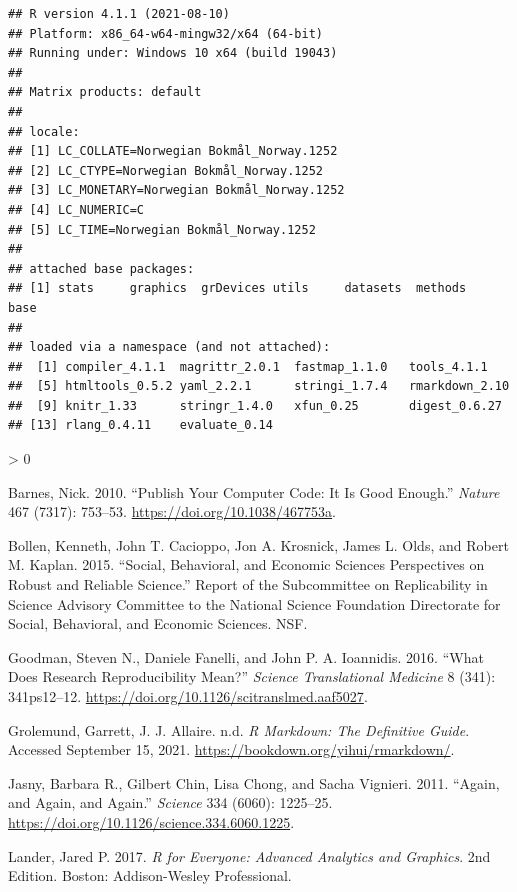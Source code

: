 \documentclass[
]{article}
\newlength{\cslhangindent}
\newenvironment{CSLReferences}[2] %
 {%
  \setlength{\parindent}{0pt}
  \ifodd #1 \everypar{\setlength{\hangindent}{\cslhangindent}}\ignorespaces\fi
  \ifnum #2 > 0
  \setlength{\parskip}{#2\baselineskip}
  \fi
 }%
 {}
\begin{document}
\begin{verbatim}
## R version 4.1.1 (2021-08-10)
## Platform: x86_64-w64-mingw32/x64 (64-bit)
## Running under: Windows 10 x64 (build 19043)
## 
## Matrix products: default
## 
## locale:
## [1] LC_COLLATE=Norwegian Bokmål_Norway.1252 
## [2] LC_CTYPE=Norwegian Bokmål_Norway.1252   
## [3] LC_MONETARY=Norwegian Bokmål_Norway.1252
## [4] LC_NUMERIC=C                            
## [5] LC_TIME=Norwegian Bokmål_Norway.1252    
## 
## attached base packages:
## [1] stats     graphics  grDevices utils     datasets  methods   base     
## 
## loaded via a namespace (and not attached):
##  [1] compiler_4.1.1  magrittr_2.0.1  fastmap_1.1.0   tools_4.1.1    
##  [5] htmltools_0.5.2 yaml_2.2.1      stringi_1.7.4   rmarkdown_2.10 
##  [9] knitr_1.33      stringr_1.4.0   xfun_0.25       digest_0.6.27  
## [13] rlang_0.4.11    evaluate_0.14
\end{verbatim}

\hypertarget{refs}{}
\begin{CSLReferences}{1}{0}
\leavevmode\hypertarget{ref-barnes_publish_2010}{}%
Barnes, Nick. 2010. {``Publish {Your} {Computer} {Code}: {It} {Is}
{Good} {Enough}.''} \emph{Nature} 467 (7317): 753--53.
\url{https://doi.org/10.1038/467753a}.

\leavevmode\hypertarget{ref-bollen_social_2015}{}%
Bollen, Kenneth, John T. Cacioppo, Jon A. Krosnick, James L. Olds, and
Robert M. Kaplan. 2015. {``Social, {Behavioral}, and {Economic}
{Sciences} {Perspectives} on {Robust} and {Reliable} {Science}.''}
Report of the Subcommittee on Replicability in Science Advisory
Committee to the National Science Foundation Directorate for Social,
Behavioral, and Economic Sciences. NSF.

\leavevmode\hypertarget{ref-goodman_what_2016}{}%
Goodman, Steven N., Daniele Fanelli, and John P. A. Ioannidis. 2016.
{``What {Does} {Research} {Reproducibility} {Mean}?''} \emph{Science
Translational Medicine} 8 (341): 341ps12--12.
\url{https://doi.org/10.1126/scitranslmed.aaf5027}.

\leavevmode\hypertarget{ref-grolemund_r_nodate}{}%
Grolemund, Garrett, J. J. Allaire. n.d. \emph{R {Markdown}: {The}
{Definitive} {Guide}}. Accessed September 15, 2021.
\url{https://bookdown.org/yihui/rmarkdown/}.

\leavevmode\hypertarget{ref-jasny_again_2011}{}%
Jasny, Barbara R., Gilbert Chin, Lisa Chong, and Sacha Vignieri. 2011.
{``Again, and {Again}, and {Again}.''} \emph{Science} 334 (6060):
1225--25. \url{https://doi.org/10.1126/science.334.6060.1225}.

\leavevmode\hypertarget{ref-lander_r_2017}{}%
Lander, Jared P. 2017. \emph{R for {Everyone}: {Advanced} {Analytics}
and {Graphics}}. 2nd Edition. Boston: Addison-Wesley Professional.

\end{CSLReferences}
\end{document}
